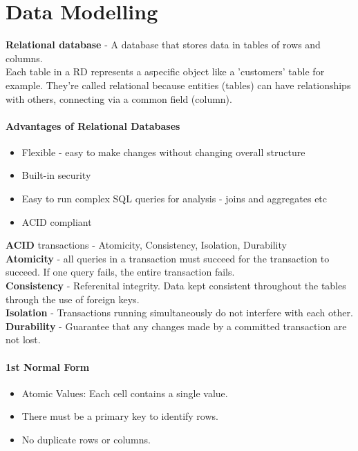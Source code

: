 \chapter{Data Modelling}

\textbf{Relational database} - A database that stores data in tables of rows and columns.\\

Each table in a RD represents a aspecific object like a 'customers' table for example.
They're called relational because entities (tables) can have relationships with others, connecting via a
common field (column).

\subsubsection*{Advantages of Relational Databases}

\begin{itemize}
    \item Flexible - easy to make changes without changing overall structure
    \item Built-in security
    \item Easy to run complex SQL queries for analysis - joins and aggregates etc
    \item ACID compliant
\end{itemize}

\textbf{ACID} transactions - Atomicity, Consistency, Isolation, Durability\\

\textbf{Atomicity} - all queries in a transaction must succeed for the transaction to succeed. 
If one query fails, the entire transaction fails.\\

\textbf{Consistency} - Referenital integrity. Data kept consistent throughout the tables
through the use of foreign keys.\\

\textbf{Isolation} - Transactions running simultaneously do not interfere with each other.\\

\textbf{Durability} - Guarantee that any changes made by a committed transaction are not lost.

\subsubsection*{1st Normal Form}

\begin{itemize}
    \item Atomic Values: Each cell contains a single value.
    \item There must be a primary key to identify rows.
    \item No duplicate rows or columns.
\end{itemize}


